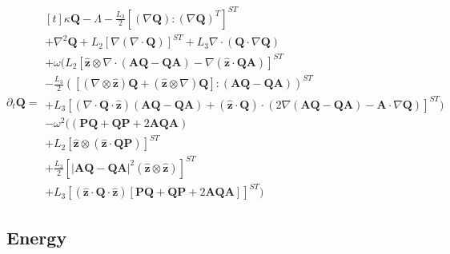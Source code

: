 \documentclass[reqno]{article}
\newcommand{\Q}{\mathbf{Q}}
\newcommand{\bP}{\mathbf{P}}
\newcommand{\A}{\mathbf{A}}
\newcommand{\z}{\mathbf{\hat{z}}}
\begin{document}
\begin{equation}
    \partial_t \Q
    =
    \begin{multlined}[t]
        \kappa \Q 
        - \Lambda 
        - \frac{L_3}{2} \left[
            \left(\nabla \Q \right) : \left( \nabla \Q \right)^T
        \right]^{ST} \\
        + \nabla^2 \Q
        + L_2 \left[ \nabla \left( \nabla \cdot \Q \right) \right]^{ST}
        + L_3 \nabla \cdot \left( \Q \cdot \nabla \Q \right) \\
        + \omega \biggl(
            L_2 \left[
                \z \otimes \nabla \cdot \left( \A \Q - \Q \A \right)
                - \nabla \left( \z \cdot \Q \A \right)
            \right]^{ST} \\
            - 
            \frac{L_3}{2} \left(
                \left[
                    \left( \nabla \otimes \z \right) \Q
                    + \left( \z \otimes \nabla \right) \Q
                \right]
                : \left(\A \Q - \Q \A \right)
            \right)^{ST} \\
            + 
            L_3 \left[
                \left( \nabla \cdot \Q \cdot \z \right) \left( \A \Q - \Q \A \right)
                + (\z \cdot \Q) \cdot \left( 
                    2 \nabla \left( \A \Q - \Q \A \right)
                    - \A \cdot \nabla \Q
                \right)
            \right]^{ST}
        \biggr) \\
        -
        \omega^2 \biggl(
            \left( \bP \Q + \Q \bP + 2 \A \Q \A \right) \\
            + L_2 \left[ \z \otimes \left( \z \cdot \Q \bP \right) \right]^{ST} \\
            + \frac{L_3}{2} \left[
                \left| \A \Q - \Q \A \right|^2 \left( \z \otimes \z \right)
            \right]^{ST} \\
            + L_3 \left[
                \left( \z \cdot \Q \cdot \z \right)
                \left[ \bP \Q + \Q \bP + 2 \A \Q \A \right]
            \right]^{ST}
        \biggr)
    \end{multlined}
\end{equation}

\subsection{Energy}
\end{document}
